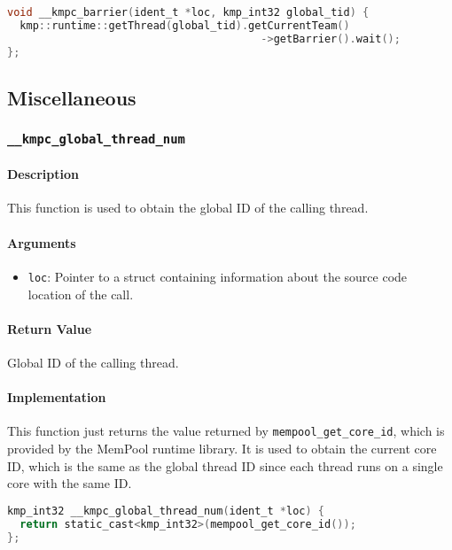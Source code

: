\begin{lstlisting}[language=C, caption={__kmpc_barrier}, label={lst:kmpc-barrier}, escapechar=@]
void __kmpc_barrier(ident_t *loc, kmp_int32 global_tid) {
  kmp::runtime::getThread(global_tid).getCurrentTeam()
                                        ->getBarrier().wait();
};
\end{lstlisting}

\subsection{Miscellaneous}

\subsubsection{\texttt{__kmpc_global_thread_num}}
\label{subsubsec:kmpc-global-thread-num}

\paragraph{Description} This function is used to obtain the global ID of the calling thread.

\paragraph{Arguments}
\begin{itemize}
	\item \texttt{loc}: Pointer to a struct containing information about the source code location
	      of the call.
\end{itemize}

\paragraph{Return Value} Global ID of the calling thread.

\paragraph{Implementation} This function just returns the value returned by
\texttt{mempool_get_core_id}, which is provided by the MemPool runtime library. It is used to obtain
the current core ID, which is the same as the global thread ID since each thread runs on a single
core with the same ID.

\begin{lstlisting}[language=C, caption={__kmpc_global_thread_num}, label={lst:kmpc-global-thread-num},
                   escapechar=@]
kmp_int32 __kmpc_global_thread_num(ident_t *loc) {
  return static_cast<kmp_int32>(mempool_get_core_id());
};
\end{lstlisting}

